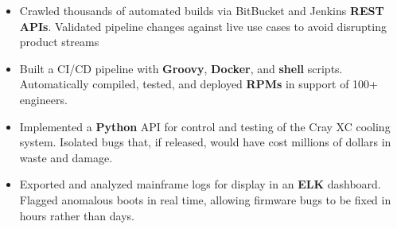 \documentclass[12pt,letterpaper]{article}
\begin{document}
\begin{itemize}[leftmargin=\parindent]
\begin{itemize}[leftmargin=\parindent]
            \item Crawled thousands of automated builds via BitBucket and Jenkins \textbf{REST APIs}. Validated pipeline changes against live use cases to avoid disrupting product streams

            \item Built a CI/CD pipeline with \textbf{Groovy}, \textbf{Docker}, and \textbf{shell} scripts. Automatically compiled, tested, and deployed \textbf{RPMs} in support of 100+ engineers.

            \item Implemented a \textbf{Python} API for control and testing of the Cray XC cooling system. Isolated bugs that, if released, would have cost millions of dollars in waste and damage.

            \item Exported and analyzed mainframe logs for display in an \textbf{ELK} dashboard. Flagged anomalous boots in real time, allowing firmware bugs to be fixed in hours rather than days.






\end{itemize}
\end{itemize}
\end{document}
